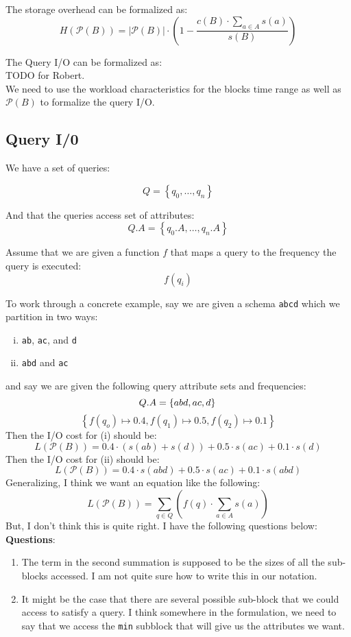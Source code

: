 \documentclass{sig-alternate}
\begin{document}
The storage overhead can be formalized as:
\begin{equation}
H(\mathcal{P}(B)) = |\mathcal{P}(B)|\cdot\left(1-\frac{c(B)\cdot \sum_{a\in A} s(a)}{s(B)}\right) 
\end{equation}

The Query I/O can be formalized as:\\
TODO for Robert.\\
We need to use the workload characteristics for the blocks time range as
well as $\mathcal{P}(B)$ to formalize the query I/O.\\

\subsection{Query I/0}

\noindent 
We have a set of queries:

$$
Q = \left\{ q_0, \dots,  q_n \right\}
$$

\noindent 
And that the queries access set of attributes:
$$
Q.A = \left\{ q_0.A, \dots,  q_n.A \right\}
$$

\noindent 
Assume that we are given a function $f$ that maps a query to the frequency the
query is executed:
$$
f(q_i)
$$

To work through a concrete example, say we are given a schema \texttt{abcd}
which we partition in two ways:
\begin{enumerate}[(i)]
\item \texttt{ab}, \texttt{ac}, and \texttt{d} 
\item \texttt{abd} and \texttt{ac} 
\end{enumerate}

\noindent 
and say we are given the following query attribute sets and frequencies:
$$
Q.A = \left\{ abd, ac, d \right\}\\
$$
$$
\left\{ f(q_o) \mapsto 0.4,  f(q_1) \mapsto 0.5,  f(q_2) \mapsto 0.1 \right\}
$$
Then the I/O cost for (i) should be:
$$
L(\mathcal{P}(B))  = 0.4 \cdot (s(ab) + s(d)) + 0.5 \cdot s(ac) + 0.1 \cdot s(d) 
$$
Then the I/O cost for (ii) should be:
$$
L(\mathcal{P}(B))  = 0.4 \cdot s(abd) + 0.5 \cdot s(ac) + 0.1 \cdot s(abd) 
$$
\noindent 
Generalizing, I think we want an equation like the following:
$$
L(\mathcal{P}(B)) = \sum_{q\in Q} \left( f(q) \cdot \sum_{a\in A} s(a) \right)
$$
\noindent 
But, I don't think this is quite right. I have the following questions below:\\
\textbf{Questions}:
\begin{enumerate}
\item The term in the second summation is supposed to be the sizes of all the
sub-blocks accessed. I am not quite sure how to write this in our notation. 
\item It might be the case that there are several possible sub-block that we
  could access to satisfy a query. I think somewhere in the formulation, we need
  to say that we access the \texttt{min} subblock that will give us the
  attributes we want.
\end{enumerate}




 
\end{document}
